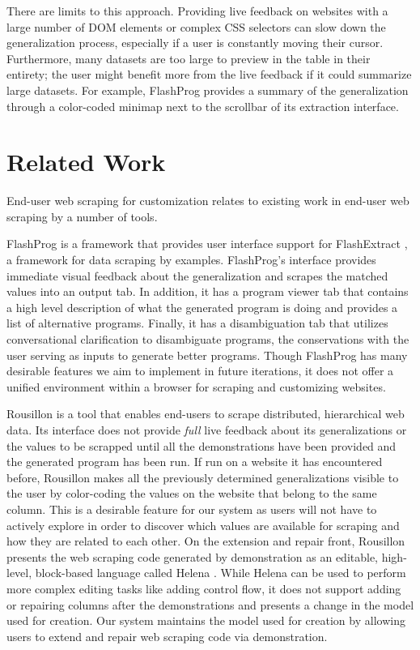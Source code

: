 \documentclass[sigconf,10pt]{acmart}
\begin{document}
There are limits to this approach. Providing live feedback on websites
with a large number of DOM elements or complex CSS selectors can slow
down the generalization process, especially if a user is constantly
moving their cursor. Furthermore, many datasets are too large to preview
in the table in their entirety; the user might benefit more from the
live feedback if it could summarize large datasets. For example,
FlashProg provides a summary of the generalization through a color-coded
minimap next to the scrollbar of its extraction interface.

\hypertarget{sec:related-work}{%
\section{Related Work}\label{sec:related-work}}

End-user web scraping for customization relates to existing work in
end-user web scraping by a number of tools.

FlashProg \citep{mayer2015} is a framework that provides user interface
support for FlashExtract \citep{le2014}, a framework for data scraping
by examples. FlashProg's interface provides immediate visual feedback
about the generalization and scrapes the matched values into an output
tab. In addition, it has a program viewer tab that contains a high level
description of what the generated program is doing and provides a list
of alternative programs. Finally, it has a disambiguation tab that
utilizes conversational clarification to disambiguate programs, the
conservations with the user serving as inputs to generate better
programs. Though FlashProg has many desirable features we aim to
implement in future iterations, it does not offer a unified environment
within a browser for scraping and customizing websites.

Rousillon \citep{chasins2018} is a tool that enables end-users to scrape
distributed, hierarchical web data. Its interface does not provide
\emph{full} live feedback about its generalizations or the values to be
scrapped until all the demonstrations have been provided and the
generated program has been run. If run on a website it has encountered
before, Rousillon makes all the previously determined generalizations
visible to the user by color-coding the values on the website that
belong to the same column. This is a desirable feature for our system as
users will not have to actively explore in order to discover which
values are available for scraping and how they are related to each
other. On the extension and repair front, Rousillon presents the web
scraping code generated by demonstration as an editable, high-level,
block-based language called Helena \citep{zotero-51}. While Helena can
be used to perform more complex editing tasks like adding control flow,
it does not support adding or repairing columns after the demonstrations
and presents a change in the model used for creation. Our system
maintains the model used for creation by allowing users to extend and
repair web scraping code via demonstration.
\end{document}
